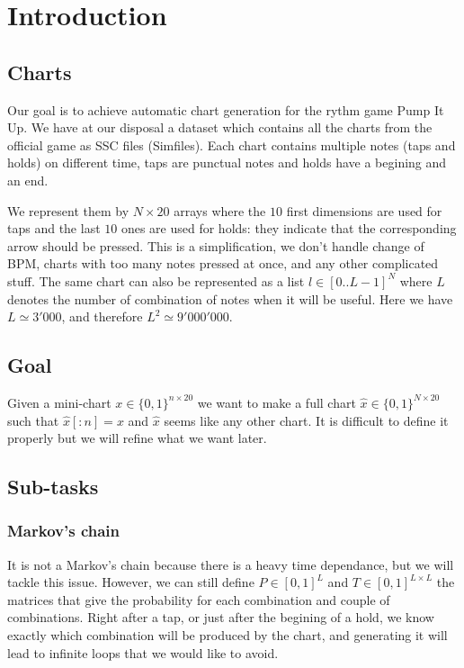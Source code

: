 \documentclass[11pt]{article}
\begin{document}
\section{Introduction}
\subsection{Charts}
Our goal is to achieve automatic chart generation for the rythm game Pump It Up. We have at our disposal a dataset which contains all the charts from the official game as SSC files (Simfiles). Each chart contains multiple notes (taps and holds) on different time, taps are punctual notes and holds have a begining and an end. 

We represent them by $N \times 20$ arrays where the $10$ first dimensions are used for taps and the last $10$ ones are used for holds: they indicate that the corresponding arrow should be pressed. This is a simplification, we don't handle change of BPM, charts with too many notes pressed at once, and any other complicated stuff. The same chart can also be represented as a list $l \in [0..L-1]^N$ where $L$ denotes the number of combination of notes when it will be useful. Here we have $L \simeq 3'000$, and therefore $L^2 \simeq 9'000'000$. 

\subsection{Goal}
Given a mini-chart $x \in \{0, 1\}^{n \times 20}$ we want to make a full chart $\hat{x} \in \{0, 1 \}^{N \times 20}$ such that $\hat{x}[:n] = x$ and $\hat{x}$ seems like any other chart. It is difficult to define it properly but we will refine what we want later. 

\subsection{Sub-tasks}
\subsubsection{Markov's chain}
It is not a Markov's chain because there is a heavy time dependance, but we will tackle this issue. However, we can still define $P \in [0,1]^L$ and $T \in [0,1]^{L \times L}$ the matrices that give the probability for each combination and couple of combinations. Right after a tap, or just after the begining of a hold, we know exactly which combination will be produced by the chart, and generating it will lead to infinite loops that we would like to avoid. 
\end{document}
